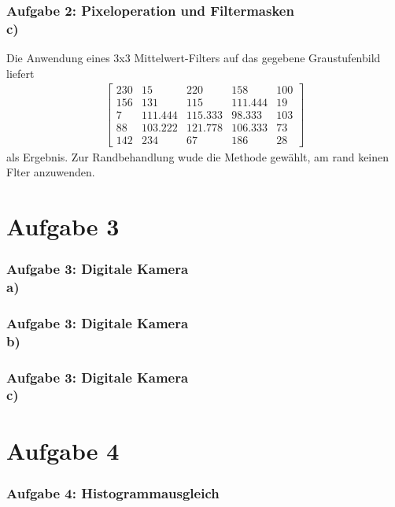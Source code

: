 \documentclass[accentcolor=tud9c,colorbacktitle,inverttitle,landscape,german,presentation,t]{tudbeamer}
\begin{document}
	\begin{frame}
		\frametitle{Aufgabe 2: Pixeloperation und Filtermasken \\ c)}
	
		Die Anwendung eines 3x3 Mittelwert-Filters auf das gegebene Graustufenbild liefert
		\begin{align*}
		\begin{bmatrix}
		230 & 15 & 220 & 158 & 100 \\
		156 & 131 & 115 & 111.444 & 19\\
		7 & 111.444 & 115.333 & 98.333 & 103\\
		88 & 103.222 & 121.778 & 106.333 & 73\\
		142 &234 & 67 & 186 & 28
		\end{bmatrix}
		\end{align*}
		als Ergebnis. Zur Randbehandlung wude die Methode gew\"ahlt, am rand keinen Flter anzuwenden.
	\end{frame}

\section{Aufgabe 3}
	\begin{frame}
		\frametitle{Aufgabe 3: Digitale Kamera \\ a)}
	\end{frame}
	
	\begin{frame}
		\frametitle{Aufgabe 3: Digitale Kamera \\ b)}
	\end{frame}
	
	\begin{frame}
		\frametitle{Aufgabe 3: Digitale Kamera \\ c)}
	\end{frame}
\section{Aufgabe 4}
	\begin{frame}[t]
		\frametitle{Aufgabe 4: Histogrammausgleich}
	\end{frame}
\end{document}
